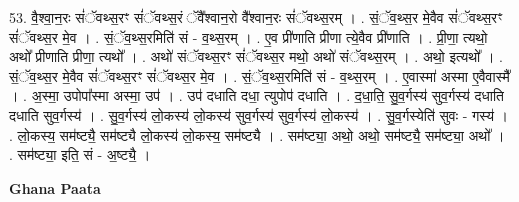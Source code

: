 \documentclass[17pt]{extarticle}
\begin{document}
53. वै॒श्वा॒न॒रः सं॑ॅवथ्स॒रꣳ सं॑ॅवथ्स॒रं ॅवै᳚श्वान॒रो वै᳚श्वान॒रः सं॑ॅवथ्स॒रम् । . सं॒ॅव॒थ्स॒र मे॒वैव सं॑ॅवथ्स॒रꣳ सं॑ॅवथ्स॒र मे॒व । . सं॒ॅव॒थ्स॒रमिति॑ सं - व॒थ्स॒रम् । . ए॒व प्री॑णाति प्रीणा त्ये॒वैव प्री॑णाति । . प्री॒णा॒ त्यथो॒ अथो᳚ प्रीणाति प्रीणा॒ त्यथो᳚ । . अथो॑ संॅवथ्स॒रꣳ सं॑ॅवथ्स॒र मथो॒ अथो॑ संॅवथ्स॒रम् । . अथो॒ इत्यथो᳚ । . सं॒ॅव॒थ्स॒र मे॒वैव सं॑ॅवथ्स॒रꣳ सं॑ॅवथ्स॒र मे॒व । . सं॒ॅव॒थ्स॒रमिति॑ सं - व॒थ्स॒रम् । . ए॒वास्मा॑ अस्मा ए॒वैवास्मै᳚ । . अ॒स्मा॒ उपोपा᳚स्मा अस्मा॒ उप॑ । . उप॑ दधाति दधा॒ त्युपोप॑ दधाति । . द॒धा॒ति॒ सु॒व॒र्गस्य॑ सुव॒र्गस्य॑ दधाति दधाति सुव॒र्गस्य॑ । . सु॒व॒र्गस्य॑ लो॒कस्य॑ लो॒कस्य॑ सुव॒र्गस्य॑ सुव॒र्गस्य॑ लो॒कस्य॑ । . सु॒व॒र्गस्येति॑ सुवः - गस्य॑ । . लो॒कस्य॒ सम॑ष्ट्यै॒ सम॑ष्ट्यै लो॒कस्य॑ लो॒कस्य॒ सम॑ष्ट्यै । . सम॑ष्ट्या॒ अथो॒ अथो॒ सम॑ष्ट्यै॒ सम॑ष्ट्या॒ अथो᳚ । . सम॑ष्ट्या॒ इति॒ सं - अ॒ष्ट्यै॒ । \newline

\textbf{Ghana Paata } \newline
\end{document}
